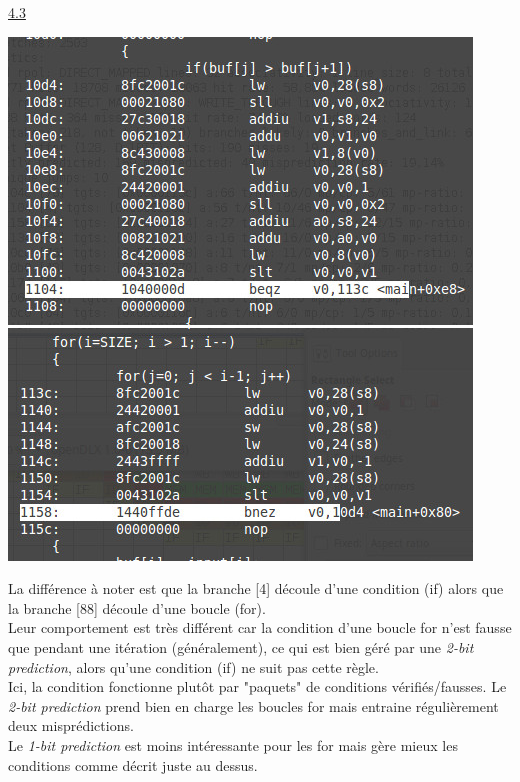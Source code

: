 \documentclass[a4paper,12pt]{article}
\begin{document}
	\underline{4.3}\\
		\par
		\begin{center}
			\includegraphics[width=\linewidth / 2]{img/4}
		\end{center}
		La différence à noter est que la branche [4] découle d'une condition (if) alors que la branche [88] découle d'une boucle (for).\\
		Leur comportement est très différent car la condition d'une boucle for n'est fausse que pendant une itération (généralement), ce qui est bien géré par une \textit{2-bit prediction}, alors qu'une condition (if) ne suit pas cette règle.\\
		Ici, la condition fonctionne plutôt par "paquets" de conditions vérifiés/fausses.
		Le \textit{2-bit prediction} prend bien en charge les boucles for mais entraine régulièrement deux misprédictions.\\
		Le \textit{1-bit prediction} est moins intéressante pour les for mais gère mieux les conditions comme décrit juste au dessus.\\
\end{document}
